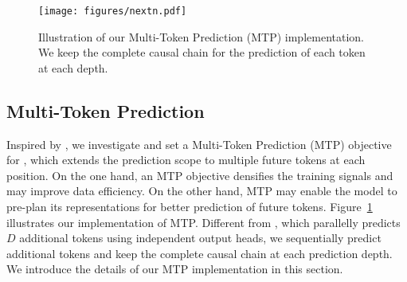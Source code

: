 \begin{figure}[!t]
\centering
\texttt{[image: figures/nextn.pdf]}
\caption{
    Illustration of our Multi-Token Prediction (MTP) implementation. 
    We keep the complete causal chain for the prediction of each token at each depth. 
}
\label{fig:nextn}
\end{figure}

\subsection{Multi-Token Prediction}

Inspired by \citet{meta_mtp}, we investigate and set a Multi-Token Prediction (MTP) objective for \dsviii{}, which extends the prediction scope to multiple future tokens at each position.
On the one hand, an MTP objective densifies the training signals and may improve data efficiency.
On the other hand, MTP may enable the model to pre-plan its representations for better prediction of future tokens.
Figure~\ref{fig:nextn} illustrates our implementation of MTP.
Different from \citet{meta_mtp}, which parallelly predicts $D$ additional tokens using independent output heads, we sequentially predict additional tokens and keep the complete causal chain at each prediction depth.
We introduce the details of our MTP implementation in this section.

